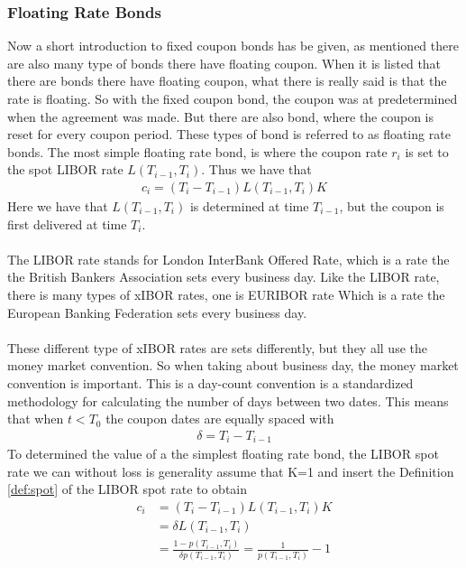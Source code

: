 \subsubsection{Floating Rate Bonds}
Now a short introduction to fixed coupon bonds has be given, as mentioned there are also many 
type of bonds there have floating coupon. When it is listed that there are bonds there have
floating coupon, what there is really said is that the rate is floating. So with the fixed coupon
bond, the coupon was at predetermined when the agreement was made. But there are also bond, where
the coupon is reset for every coupon period. These types of bond is referred to as floating 
rate bonds. The most simple floating rate bond, is where the coupon rate $r_i$ is set to 
the spot LIBOR rate $L(T_{i-1}, T_i)$. Thus we have that 
\begin{align*}
    c_i = (T_i-T_{i-1})L(T_{i-1},T_i)K
\end{align*}
Here we have that $L(T_{i-1},T_i)$ is determined at time $T_{i-1}$, but the coupon is first 
delivered at time $T_i$. \cite{Bjork}  
\\\\
The LIBOR rate stands for London InterBank Offered Rate, which is a rate the the 
British Bankers Association sets every business day. Like the LIBOR rate, there is many types
of xIBOR rates, one is EURIBOR rate Which is a rate the 
European Banking Federation sets every business day. 
\\\\
These different type of xIBOR rates are sets differently, but they all use the money market convention. 
So when taking about business day, the money market convention is important. This is a day-count 
convention is a standardized methodology for calculating the number of days between two dates.
This means that when $t <T_0$  the coupon dates are equally spaced with  
\begin{align*}
    \delta = T_{i}-T_{i-1}
\end{align*}
To determined the value of a the simplest floating rate bond, the LIBOR spot rate we can without
loss is generality assume that K=1 and insert the Definition \ref{def:spot} of the LIBOR spot rate 
to obtain
\begin{align*}
    c_i &= (T_i-T_{i-1})L(T_{i-1},T_i)K \\
        &= \delta L(T_{i-1},T_i) \\
        &= \frac{1- p(T_{i-1},T_i)}{\delta p(T_{i-1},T_i)} = \frac{1}{p(T_{i-1},T_i)}-1
\end{align*}

